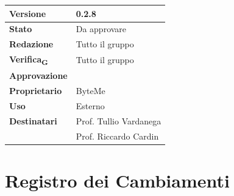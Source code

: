 \documentclass[11pt,a4paper]{article}
\newcommand{\gls}[1]{#1\textsubscript{G}}
\begin{document}
\begin{titlepage}
    \begin{table}[H]
        \centering
        \begin{tabular}{|l|p{5cm}|}
            \hline
            \textbf{Versione} & 0.2.8 \\
            \hline
            \textbf{Stato} & Da approvare \\
            \hline
            \textbf{Redazione} & Tutto il gruppo\\
            \hline
            \textbf{\gls{Verifica}} & Tutto il gruppo\\
            \hline
            \textbf{Approvazione} & \\
            \hline
            \textbf{Proprietario} & ByteMe \\
            \hline
            \textbf{Uso} & Esterno \\
            \hline
            \textbf{Destinatari} & Prof. Tullio Vardanega \\ & Prof. Riccardo Cardin \\
            \hline
        \end{tabular}
    \end{table}
    
    \vfill
\end{titlepage}

\thispagestyle{empty}
\section*{Registro dei Cambiamenti}
\end{document}
